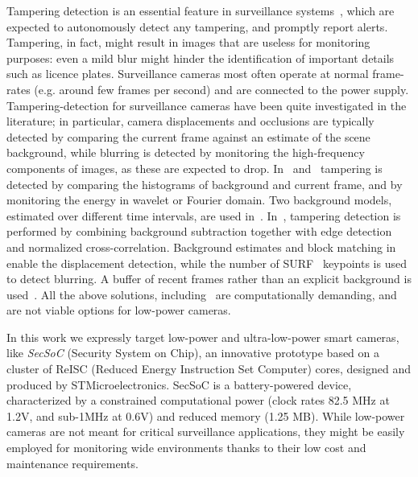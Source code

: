 \documentclass{llncs}
\begin{document}
Tampering detection is an essential feature in surveillance systems~\cite{hampapur2005smart}, which are expected to autonomously detect any tampering, and promptly report alerts. Tampering, in fact, might result in images that are useless for monitoring purposes: even a mild blur might hinder the identification of important details such as licence plates. Surveillance cameras most often operate at normal frame-rates (e.g. around few frames per second) and are connected to the power supply. Tampering-detection for surveillance cameras have been quite investigated in the literature; in particular, camera displacements and occlusions are typically detected by comparing the current frame against an estimate of the scene background, while blurring is detected by monitoring the high-frequency components of images, as these are expected to drop. In~\cite{aksay2007camera} and~\cite{saglam2009real} tampering is detected by comparing the histograms of background and current frame, and by monitoring the energy in wavelet or Fourier domain. Two background models, estimated over different time intervals, are used in~\cite{saglam2009real}. In~\cite{gil2007automatic}, tampering detection is performed by combining background subtraction together with edge detection and normalized cross-correlation. Background estimates and block matching in~\cite{tsesmelis2013tamper} enable the displacement detection, while the number of SURF~\cite{bay2006surf} keypoints is used to detect blurring. A buffer of recent frames rather than an explicit background is used~\cite{ribnick2006real}. All the above solutions, including~\cite{harasse2004automated,kryjak2012fpga} are computationally demanding, and are not viable options for low-power cameras.

In this work we expressly target low-power and ultra-low-power smart cameras, like \emph{SecSoC} (Security System on Chip), an innovative prototype based on a cluster of ReISC (Reduced Energy Instruction Set Computer) cores, designed and produced by STMicroelectronics. SecSoC is a battery-powered device, characterized by a constrained computational power (clock rates 82.5 MHz at 1.2V, and sub-1MHz at 0.6V) and reduced memory (1.25 MB). While low-power cameras are not meant for critical surveillance applications, they might be easily employed for monitoring wide environments thanks to their low cost and maintenance requirements.  %
\end{document}
